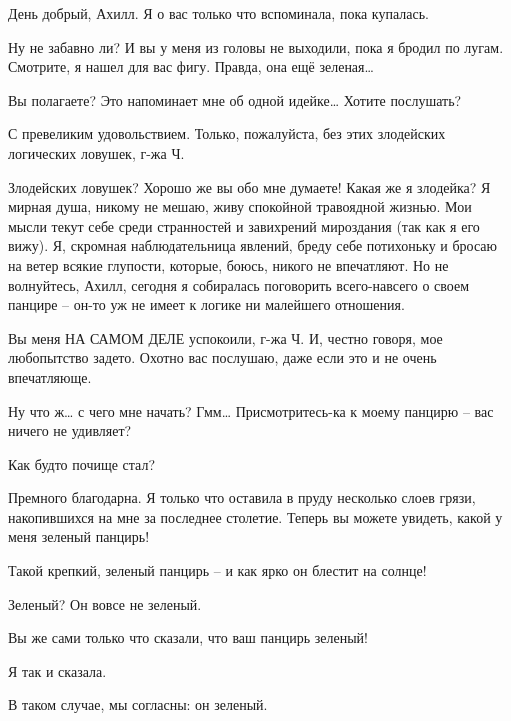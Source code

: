 \documentclass[../main.tex]{subfiles}
\begin{document}


\begin{dialogue}

 День добрый, Ахилл. Я о вас только что вспоминала, пока купалась.

 Ну не забавно ли? И вы у меня из головы не выходили, пока я бродил по лугам. Смотрите, я нашел для вас фигу. Правда, она ещё зеленая\ldots{}

 Вы полагаете? Это напоминает мне об одной идейке\ldots{} Хотите послушать?

 С превеликим удовольствием. Только, пожалуйста, без этих злодейских логических ловушек, г-жа Ч\@.

 Злодейских ловушек? Хорошо же вы обо мне думаете! Какая же я злодейка? Я мирная душа, никому не мешаю, живу спокойной травоядной жизнью. Мои мысли текут себе среди странностей и завихрений мироздания (так как я его вижу). Я, скромная наблюдательница явлений, бреду себе потихоньку и бросаю на ветер всякие глупости, которые, боюсь, никого не впечатляют. Но не волнуйтесь, Ахилл, сегодня я собиралась поговорить всего-навсего о своем панцире \--- он-то уж не имеет к логике ни малейшего отношения.

 Вы меня НА САМОМ ДЕЛЕ успокоили, г-жа Ч\@. И, честно говоря, мое любопытство задето. Охотно вас послушаю, даже если это и не очень впечатляюще.

 Ну что ж\ldots{} с чего мне начать? Гмм\ldots{} Присмотритесь-ка к моему панцирю \--- вас ничего не удивляет?

 Как будто почище стал?

 Премного благодарна. Я только что оставила в пруду несколько слоев грязи, накопившихся на мне за последнее столетие. Теперь вы можете увидеть, какой у меня зеленый панцирь!

 Такой крепкий, зеленый панцирь \--- и как ярко он блестит на солнце!

 Зеленый? Он вовсе не зеленый.

 Вы же сами только что сказали, что ваш панцирь зеленый!

 Я так и сказала.

 В таком случае, мы согласны: он зеленый.


\end{dialogue}
\end{document}
